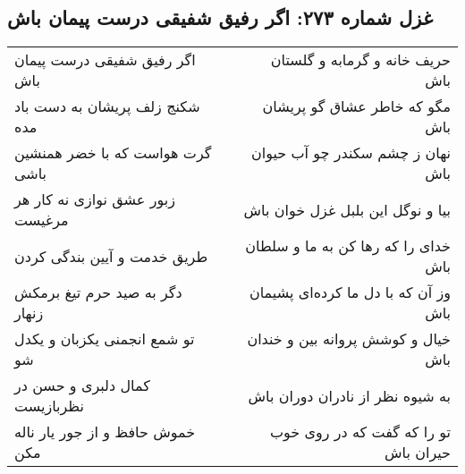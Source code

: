 \begin{center}
\section*{غزل شماره ۲۷۳: اگر رفیق شفیقی درست پیمان باش}
\label{sec:sh273}
\begin{longtable}{l p{0.5cm} r}
اگر رفیق شفیقی درست پیمان باش
&&
حریف خانه و گرمابه و گلستان باش
\\
شکنج زلف پریشان به دست باد مده
&&
مگو که خاطر عشاق گو پریشان باش
\\
گرت هواست که با خضر همنشین باشی
&&
نهان ز چشم سکندر چو آب حیوان باش
\\
زبور عشق نوازی نه کار هر مرغیست
&&
بیا و نوگل این بلبل غزل خوان باش
\\
طریق خدمت و آیین بندگی کردن
&&
خدای را که رها کن به ما و سلطان باش
\\
دگر به صید حرم تیغ برمکش زنهار
&&
وز آن که با دل ما کرده‌ای پشیمان باش
\\
تو شمع انجمنی یکزبان و یکدل شو
&&
خیال و کوشش پروانه بین و خندان باش
\\
کمال دلبری و حسن در نظربازیست
&&
به شیوه نظر از نادران دوران باش
\\
خموش حافظ و از جور یار ناله مکن
&&
تو را که گفت که در روی خوب حیران باش
\\
\end{longtable}
\end{center}

